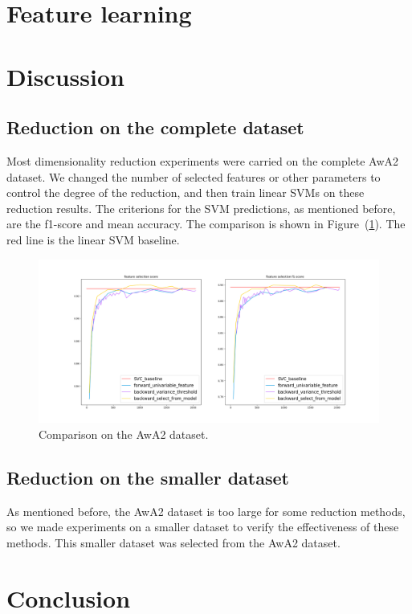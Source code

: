 \documentclass{article}
\begin{document}
\section{Feature learning}
\label{sec:learning}

\section{Discussion}
\label{sec:discussion}
\subsection{Reduction on the complete dataset}
Most dimensionality reduction experiments were carried on the complete AwA2 dataset. We changed the number of selected features or other parameters to control the degree of the reduction, and then train linear SVMs on these reduction results. The criterions for the SVM predictions, as mentioned before, are the f1-score and mean accuracy. The comparison is shown in Figure~(\ref{fig:complete}). The red line is the linear SVM baseline.
  \begin{figure}
  	\label{fig:complete}
  	\caption{Comparison on the AwA2 dataset.}
  	\includegraphics[width=\linewidth]{figs/feature_selection.png}
  \end{figure}

\subsection{Reduction on the smaller dataset}
As mentioned before, the AwA2 dataset is too large for some reduction methods, so we made experiments on a smaller dataset to verify the effectiveness of these methods. This smaller dataset was selected from the AwA2 dataset.

\section{Conclusion}

  

\end{document}
